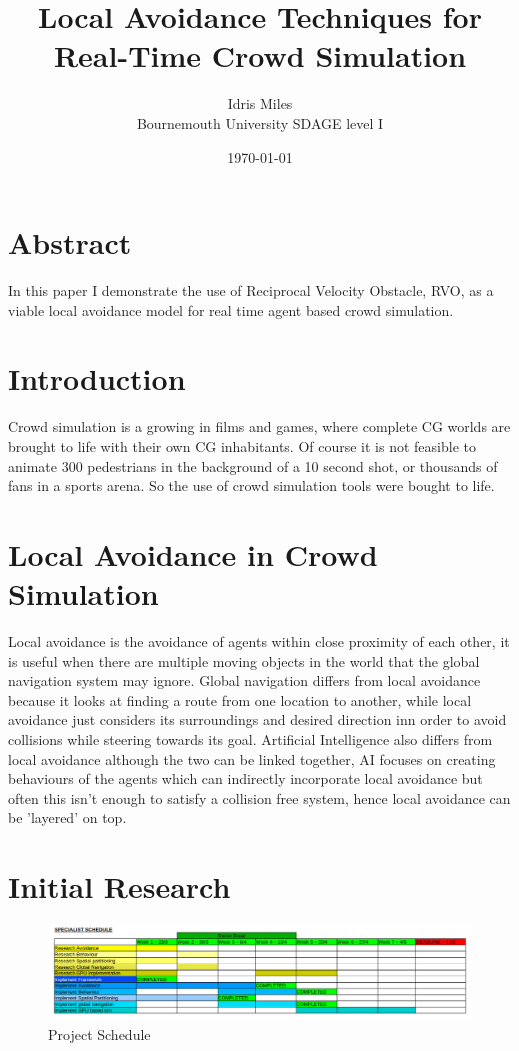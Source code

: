 \documentclass[a4paper,twocolumn]{article}
\author{Idris Miles\\
Bournemouth University SDAGE level I}
\title{Local Avoidance Techniques for Real-Time Crowd Simulation}
\date{\today}
\begin{document}
\maketitle

\section*{Abstract}
In this paper I demonstrate the use of Reciprocal Velocity Obstacle, RVO, as a viable local avoidance model for real time agent based crowd simulation. \\

\section{Introduction}
Crowd simulation is a growing in films and games, where complete CG worlds are brought to life with their own CG inhabitants. Of course it is not feasible to animate 300 pedestrians in the background of a 10 second shot, or thousands of fans in a sports arena. So the use of crowd simulation tools were bought to life.

\section{Local Avoidance in Crowd Simulation}
Local avoidance is the avoidance of agents within close proximity of each other, it is useful when there are multiple moving objects in the world that the global navigation system may ignore. Global navigation differs from local avoidance because it looks at finding a route from one location to another, while local avoidance just considers its surroundings and desired direction inn order to avoid collisions while steering towards its goal. Artificial Intelligence also differs from local avoidance although the two can be linked together, AI focuses on creating behaviours of the agents which can indirectly incorporate local avoidance but often this isn't enough to satisfy a collision free system, hence local avoidance can be 'layered' on top.\\

\section{Initial Research}
\begin{figure}
\includegraphics[scale=0.2]{../schedule/specialistSchedule.png}
\caption{Project Schedule}
\label{fig:schedule}
\end{figure}
\end{document}
